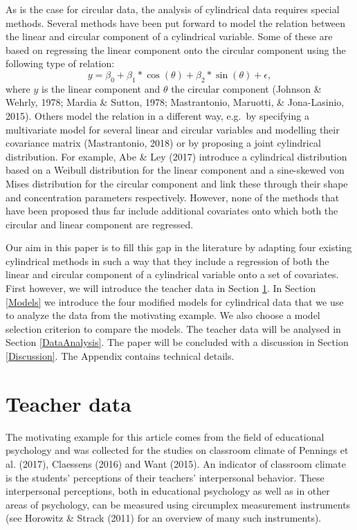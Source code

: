 \documentclass[11pt,]{article}
\begin{document}
As is the case for circular data, the analysis of cylindrical data
requires special methods. Several methods have been put forward to model
the relation between the linear and circular component of a cylindrical
variable. Some of these are based on regressing the linear component
onto the circular component using the following type of relation:
\[y = \beta_0 + \beta_1*\cos(\theta) + 
\beta_2*\sin(\theta)+ \epsilon,\] where \(y\) is the linear component
and \(\theta\) the circular component (Johnson \& Wehrly, 1978; Mardia
\& Sutton, 1978; Mastrantonio, Maruotti, \& Jona-Lasinio, 2015). Others
model the relation in a different way, e.g.~by specifying a multivariate
model for several linear and circular variables and modelling their
covariance matrix (Mastrantonio, 2018) or by proposing a joint
cylindrical distribution. For example, Abe \& Ley (2017) introduce a
cylindrical distribution based on a Weibull distribution for the linear
component and a sine-skewed von Mises distribution for the circular
component and link these through their shape and concentration
parameters respectively. However, none of the methods that have been
proposed thus far include additional covariates onto which both the
circular and linear component are regressed.

Our aim in this paper is to fill this gap in the literature by adapting
four existing cylindrical methods in such a way that they include a
regression of both the linear and circular component of a cylindrical
variable onto a set of covariates. First however, we will introduce the
teacher data in Section \ref{Example}. In Section \ref{Models} we
introduce the four modified models for cylindrical data that we use to
analyze the data from the motivating example. We also choose a model
selection criterion to compare the models. The teacher data will be
analysed in Section \ref{DataAnalysis}. The paper will be concluded with
a discussion in Section \ref{Discussion}. The Appendix contains
technical details.

\section{Teacher data}\label{Example}

The motivating example for this article comes from the field of
educational psychology and was collected for the studies on classroom
climate of Pennings et al. (2017), Claessens (2016) and Want (2015). An
indicator of classroom climate is the students' perceptions of their
teachers' interpersonal behavior. These interpersonal perceptions, both
in educational psychology as well as in other areas of psychology, can
be measured using circumplex measurement instruments (see Horowitz \&
Strack (2011) for an overview of many such instruments).
\end{document}
